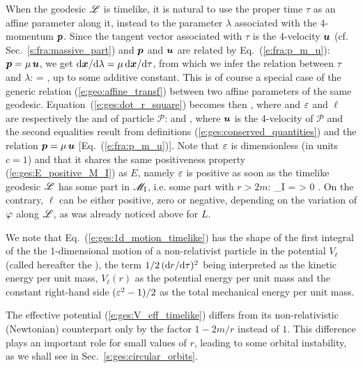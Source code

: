 When the geodesic $\mathscr{L}$ is timelike, it is natural to use the proper time $\tau$
as an affine parameter along it, instead to the parameter $\lambda$ associated
with the 4-momentum $\bm{p}$. Since the tangent vector associated with $\tau$
is the 4-velocity $\bm{u}$ (cf. Sec.~\ref{s:fra:massive_part}) and $\bm{p}$ and $\bm{u}$ are related by
Eq.~(\ref{e:fra:p_m_u}): $\bm{p} = \mu \, \bm{u}$, we get
$\mathrm{d}\bm{x}/\mathrm{d}\lambda = \mu \, \mathrm{d}\bm{x}/\mathrm{d}\tau$, from which we infer the relation
between $\tau$ and $\lambda$:
\be
    \tau = \mu \lambda ,
\ee
up to some additive constant. This is
of course a special case of the generic relation (\ref{e:geo:affine_transf})
between two affine parameters of the same geodesic.
Equation~(\ref{e:ges:dot_r_square}) becomes then
\be \label{e:ges:1d_motion_timelike}
     ,
\ee
where
\be \label{e:ges:V_eff_timelike}
\ee
and $\varepsilon$ and $\ell$ are respectively the
and 
of particle $\mathscr{P}$:
\be \label{e:ges:def_eps_ell}
  \qquad\mbox{and}\qquad
   ,
\ee
where $\bm{u}$ is the 4-velocity of $\mathscr{P}$ and the second equalities
result from definitions (\ref{e:ges:conserved_quantities})
and the relation $\bm{p} = \mu \, \bm{u}$ [Eq.~(\ref{e:fra:p_m_u})].
Note that $\varepsilon$ is dimensionless (in units $c=1$) and that it shares the
same positiveness property (\ref{e:ges:E_positive_M_I}) as $E$,
namely $\varepsilon$ is positive as soon as the timelike geodesic $\mathscr{L}$ has some part
in $\mathscr{M}_{\rm I}$, i.e. some part with $r>2m$:
\be \label{e:ges:eps_positive_M_I}
    \Li \cap \M_{\rm I} \not= \varnothing \quad \Longrightarrow \quad \veps > 0 .
\ee
On the contrary, $\ell$ can be either positive, zero or negative, depending
on the variation of $\varphi$ along $\mathscr{L}$, as was already noticed above for $L$.

We note that Eq.~(\ref{e:ges:1d_motion_timelike}) has the shape of the
first integral of the
the 1-dimensional motion of a non-relativist particle in the potential
$V_{\ell}$ (called hereafter the ), the term $1/2 \, (\mathrm{d} r/\mathrm{d}\tau)^2$ being interpreted as
the kinetic energy per unit mass, $V_{\ell}(r)$ as the potential
energy per unit mass and the constant right-hand side $(\varepsilon^2-1)/2$ as the total
mechanical energy per unit mass.
\begin{remark} \label{r:ges:V_eff_Newt}
The effective potential (\ref{e:ges:V_eff_timelike}) differs from its
non-relativistic (Newtonian) counterpart only by the factor $1-2m/r$ instead of
$1$. This difference plays an important role for small values of $r$,
leading to some orbital instability, as we shall see in Sec.~\ref{s:ges:circular_orbits}.
\end{remark}


